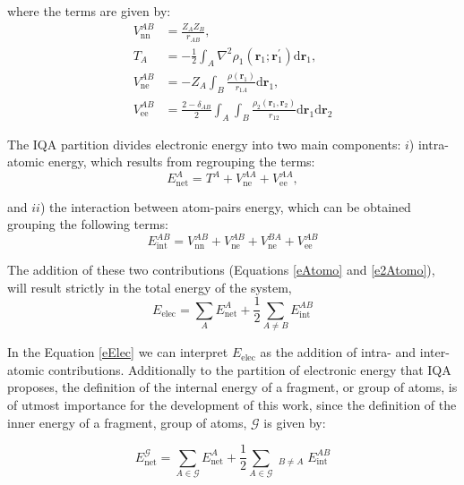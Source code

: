 \noindent where the terms are given by:
%
\begin{align}
  V_{\mathrm{nn}}^{AB} &=  \frac{Z_A Z_B}{r_{AB}}, \label{VnnAB} \\
  T_A                  &= -\frac{1}{2} \int_A \nabla^2 \rho_1 (\mathbf{r}_1;\mathbf{r}_1^{\prime})
    \mathrm{d} \mathbf{r}_1, \label{cineticaMono} \\
  V_{\mathrm{ne}}^{AB} &= - Z_A \int_B \frac{\rho(\mathbf{r}_1)}{r_{1A}} \mathrm{d}
	  \mathbf{r}_1, \label{nucleoElecMono} \\
  V_{\mathrm{ee}}^{AB} &= \frac{2 - \delta_{AB}}{2} \int_A \int_B
	  \frac{\rho_2(\mathbf{r}_1,\mathbf{r}_2)}{r_{12}} \mathrm{d} \mathbf{r}_1
	  \mathrm{d} \mathbf{r}_2 \label{elecElec2Atoms}
\end{align}

The IQA partition divides electronic energy into two main components: $i$)
intra-atomic energy, which results from regrouping the terms:
%
\begin{equation} \label{eAtomo}
  E^A_{\mathrm{net}} = T^A + V_{\mathrm{ne}}^{AA} + V_{\mathrm{ee}}^{AA},
\end{equation}

\noindent and $ii$) the interaction between atom-pairs energy, which can be
obtained grouping the following terms:
\begin{equation} \label{e2Atomo}
  E^{AB}_{\mathrm{int}} = V_{\mathrm{nn}}^{AB} + V_{\mathrm{ne}}^{AB}
  + V_{\mathrm{ne}}^{BA} + V_{\mathrm{ee}}^{AB}
\end{equation}

The addition of these two contributions (Equations \ref{eAtomo} and
\ref{e2Atomo}), will result strictly in the total energy of the system,
%
\begin{equation} \label{eElec}
  E_{\mathrm{elec}} = 
    \sum_A E^A_{\mathrm{net}} + \frac{1}{2} \sum_{A \neq B} E_{\mathrm{int}}^{AB}
\end{equation}

In the Equation \ref{eElec} we can interpret $E_{\mathrm{elec}}$ as the
addition of intra- and inter-atomic contributions.  Additionally to the
partition of electronic energy that IQA proposes, the definition of the
internal energy of a fragment, or group of atoms, is of utmost importance for
the development of this work, since the definition of the inner energy of a
fragment, group of atoms, $\mathscr{G}$ is given by:

\begin{equation} \label{eG}
E^{\mathscr{G}}_{\mathrm{net}} = \sum_{A \in \mathscr{G}} E^A_{\mathrm{net}} 
	       +\frac{1}{2} \sum_{A\in \mathscr{G}}
		\mathop{\sum_{B \in \mathscr{G}}}_{B \neq A} E_{\mathrm{int}}^{AB}
\end{equation}

